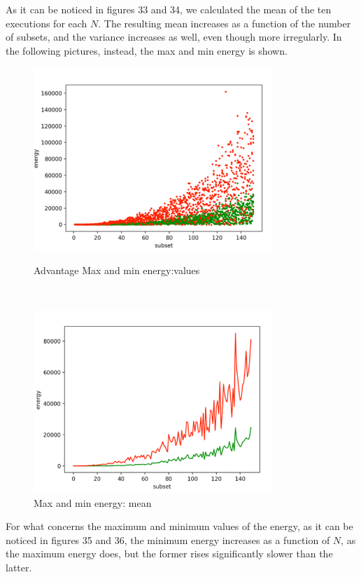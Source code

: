 \documentclass[oneside,a4paper]{article}
\begin{document}
As it can be noticed in figures 33 and 34, we calculated the mean of the ten executions for each $N$. The resulting mean increases as a function of the number of subsets, and the variance increases as well, even though more irregularly. In the following pictures, instead, the max and min energy is shown.
\newpage
\begin{figure}[htp]
\begin{minipage}[b]{9cm}
\centering
\includegraphics[width=9cm]{LaTeXTemplate/Images/MaxMinAdvValues.png}
\caption{Advantage Max and min energy:values}
\end{minipage}
\ \hspace{2mm} \hspace{2mm} \
\begin{minipage}[b]{9cm}
\centering
\includegraphics[width=9cm]{LaTeXTemplate/Images/MaxMinAdvMean.png}
\caption{Max and min energy: mean}
\end{minipage}
\end{figure}

For what concerns the maximum and minimum values of the energy, as it can be noticed in figures 35 and 36, the minimum energy increases as a function of $N$, as the maximum energy does, but the former rises significantly slower than the latter.
\end{document}

